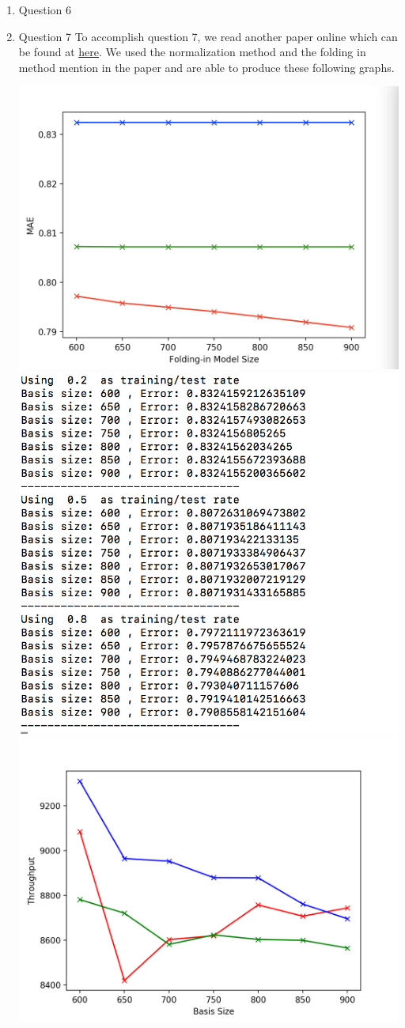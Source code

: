 \documentclass[11pt]{article}
\begin{document}
\begin{enumerate}
\item Question 6\newline

\item Question 7\newline
To accomplish question 7, we read another paper online which can be found at \href{https://drive.google.com/file/d/0BylQe2cRVWE_RmZoUTJYSGZNaXM/view}{here}. We used the normalization method and the folding in method mention in the paper and are able to produce these following graphs.

\includegraphics[width=0.7\columnwidth]{q7_result1}\\
\includegraphics[width=0.7\columnwidth]{q7_result2}\\
\includegraphics[width=0.7\columnwidth]{q7_result3}

\end{enumerate}
\end{document}
